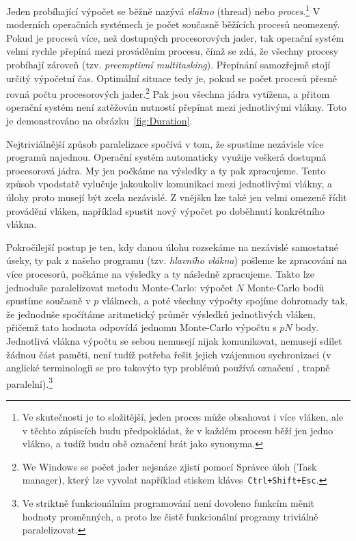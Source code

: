 \documentclass[a4paper,11pt,twoside]{article}
\def\code#1{\textnormal{\texttt{#1}}}
\theoremstyle{red}
\theoremstyle{green}
\begin{document}
    Jeden probíhající výpočet se běžně nazývá \emph{vlákno} (thread) nebo \emph{proces}.\footnote{
        Ve skutečnosti je to složitější, jeden proces může obsahovat i více vláken, ale v těchto zápiscích budu předpokládat, že v každém procesu běží jen jedno vlákno, a tudíž budu obě označení brát jako synonyma.
    }
    V moderních operačních systémech je počet současně běžících procesů neomezený.
    Pokud je procesů více, než dostupných procesorových jader, tak operační systém velmi rychle přepíná mezi prováděním procesu, čímž se zdá, že všechny procesy probíhají zároveň (tzv. \emph{preemptivní multitasking}).
    Přepínání samozřejmě stojí určitý výpočetní čas.
    Optimální situace tedy je, pokud se počet procesů přesně rovná počtu procesorových jader.\footnote{
        We Windows se počet jader nejsnáze zjistí pomocí Správce úloh (Task manager), který lze vyvolat například stiskem kláves~\code{Ctrl+Shift+Esc}.
    }
    Pak jsou všechna jádra vytížena, a přitom operační systém není zatěžován nutností přepínat mezi jednotlivými vlákny. 
    Toto je demonstrováno na obrázku~\ref{fig:Duration}.
    
    Nejtriviálnější způsob paralelizace spočívá v tom, že spustíme nezávisle více programů najednou.
    Operační systém automaticky využije veškerá dostupná procesorová jádra.
    My jen počkáme na výsledky a ty pak zpracujeme.
    Tento způsob vpodstatě vylučuje jakoukoliv komunikaci mezi jednotlivými vlákny, a úlohy proto musejí být zcela nezávislé.
    Z vnějšku lze také jen velmi omezeně řídit provádění vláken, například spustit nový výpočet po doběhnutí konkrétního vlákna. 

    Pokročilejší postup je ten, kdy danou úlohu rozsekáme na nezávislé samostatné úseky, ty pak z našeho programu (tzv. \emph{hlavního vlákna}) pošleme ke zpracování na více procesorů, počkáme na výsledky a ty následně zpracujeme.
    Takto lze jednoduše paralelizovat metodu Monte-Carlo: výpočet $N$ Monte-Carlo bodů spustíme současně v $p$ vláknech, a poté všechny výpočty spojíme dohromady tak, že jednoduše spočítáme aritmetický průměr výsledků jednotlivých vláken, přičemž tato hodnota odpovídá jednomu Monte-Carlo výpočtu s $pN$ body.
    Jednotlivá vlákna výpočtu se sebou nemusejí nijak komunikovat, nemusejí sdílet žádnou část paměti, není tudíž potřeba řešit jejich vzájemnou sychronizaci (v anglické terminologii se pro takovýto typ problémů používá označení , trapně paralelní).\footnote{
        Ve striktně funkcionálním programování není dovoleno funkcím měnit hodnoty proměnných, a proto lze čistě funkcionální programy triviálně paralelizovat.
    }
    
\end{document}
